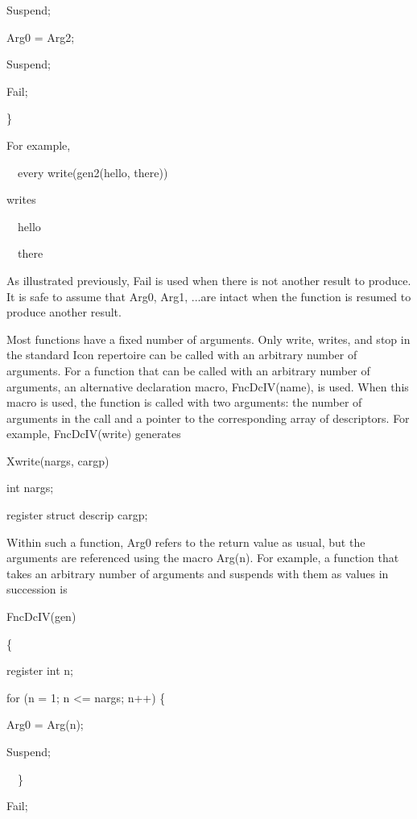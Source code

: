 {\ttfamily\mdseries
Suspend;}

{\ttfamily\mdseries
Arg0 = Arg2;}

{\ttfamily\mdseries
Suspend;}

{\ttfamily\mdseries
Fail;}

{\ttfamily\mdseries
\}}


For example,


\ \ every write(gen2({\textquotedbl}hello{\textquotedbl}, {\textquotedbl}there{\textquotedbl}))


writes

{\ttfamily\mdseries
\ \ hello}

{\ttfamily\mdseries
\ \ there}


As illustrated previously, Fail is used when there is not another
result to produce. It is safe to assume that Arg0, Arg1, ...are intact
when the function is resumed to produce another result.

Most functions have a fixed number of arguments. Only write, writes,
and stop in the standard Icon repertoire can be called with an
arbitrary number of arguments. For a function that can be called with
an arbitrary number of arguments, an alternative declaration macro,
FncDcIV(name), is used. When this macro is used, the function is
called with two arguments: the number of arguments in the call and a
pointer to the corresponding array of descriptors. For example,
FncDcIV(write) generates

{\ttfamily\mdseries
Xwrite(nargs, cargp)}

{\ttfamily\mdseries
int nargs;}

{\ttfamily\mdseries
register struct descrip cargp;}


Within such a function, Arg0 refers to the return value as usual, but
the arguments are referenced using the macro Arg(n). For example, a
function that takes an arbitrary number of arguments and suspends with
them as values in succession is

{\ttfamily\mdseries
FncDcIV(gen)}

{\ttfamily\mdseries
\{}

{\ttfamily\mdseries
register int n;}

{\ttfamily\mdseries
for (n = 1; n {\textless}= nargs; n++) \{}

{\ttfamily\mdseries
Arg0 = Arg(n);}

{\ttfamily\mdseries
Suspend;}

{\ttfamily\mdseries
\ \ \}}

{\ttfamily\mdseries
Fail;}

